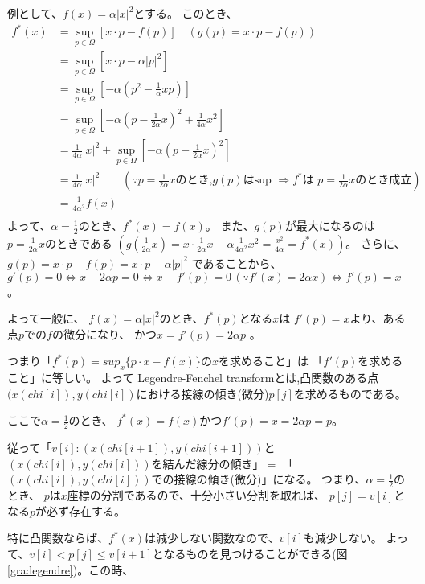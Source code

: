 例として、$f(x) = \alpha |x|^2$とする。
このとき、
\begin{align*}
f^*(x) &= \displaystyle \sup_{p\in \Omega}{[x \cdot p - f(p)]} \quad (g(p) = x \cdot p - f(p))\\
           &=\displaystyle \sup_{p\in \Omega}{[x \cdot p - \alpha |p|^2]}\\
           &= \displaystyle \sup_{p\in \Omega}{[- \alpha(p^2 - \frac{1}{\alpha}xp)]}\\
           &= \displaystyle \sup_{p\in \Omega}{[- \alpha(p - \frac{1}{2 \alpha}x)^2 +  \frac{1}{4 \alpha}x^2]}\\
           &=  \frac{1}{4 \alpha}|x|^2 + \sup_{p\in \Omega}{[- \alpha(p - \frac{1}{2 \alpha}x)^2]}\\
           &= \frac{1}{4 \alpha}|x|^2 \qquad (\because  \text{$p = \frac{1}{2 \alpha}x$のとき,$g(p)$はsup $\Rightarrow f^*$は $p = \frac{1}{2 \alpha}x$のとき成立})\\
           &= \frac{1}{4 \alpha^2}f(x)\\
\end{align*}
よって、$\alpha = \frac{1}{2}$のとき、$f^*(x) = f(x)。$
また、$g(p)$が最大になるのは$p = \frac{1}{2 \alpha}x$のときである
$(g( \frac{1}{2 \alpha}x) = x \cdot \frac{1}{2 \alpha}x - \alpha  \frac{1}{4 \alpha^2}x^2 =  \frac{x^2}{4 \alpha} = f^*(x))$。
さらに、
$g(p) = x \cdot p - f(p)= x \cdot p - \alpha |p|^2$
であることから、
$g'(p) = 0 \Leftrightarrow x - 2 \alpha p = 0 \Leftrightarrow x - f'(p) = 0 \, (\because f'(x) = 2 \alpha x) \Leftrightarrow f'(p) = x$ 。

よって一般に、 $f(x) = \alpha |x| ^2$のとき、$f^*(p)$となる$x$は $f'(p) = x$より、ある点$p$での$f$の微分になり、 
かつ$x = f'(p) = 2\alpha p$ 。

つまり「$f^*(p)= sup_x\{p \cdot x - f(x) \} $の$x$を求めること」は 「$f'(p)$を求めること」に等しい。
よって Legendre-Fenchel transformとは,凸関数のある点$(x(chi[i]), y(chi[i])$における接線の傾き(微分)$p[j]$を求めるものである。


ここで$\alpha = \frac{1}{2}$のとき、 $f^*(x) = f(x) かつf'(p) = x = 2\alpha p = p$。

従って「$v[i]: (x(chi[i+1]), y(chi[i+1]))$と$(x(chi[i]), y(chi[i]))$を結んだ線分の傾き」$=$ 「$(x(chi[i]), y(chi[i]))$での接線の傾き(微分)」になる。
つまり、$\alpha = \frac{1}{2}$のとき、 $p$は$x$座標の分割であるので、十分小さい分割を取れば、 $p[j] = v[i]$となる$p$が必ず存在する。

特に凸関数ならば、$f^*(x)$は減少しない関数なので、$v[i]$も減少しない。
よって、$v[i] < p[j] \leq v[i+1]$となるものを見つけることができる(図\ref{gra:legendre})。この時、

